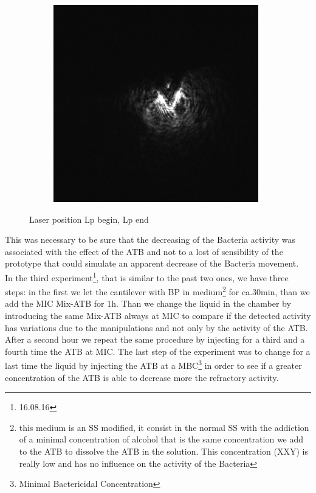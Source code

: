 \documentclass[11pt, a4paper]{article}
\begin{document}
\begin{figure}[h]
\begin{subfigure}{0.245\linewidth}
		\includegraphics[width=1\linewidth]{FFT/Lp_0208_correct} %
		\caption{}\label{fig:0208}
	\end{subfigure}
\caption{Laser position  Lp begin,  Lp end} 
\end{figure}%
This was necessary to be sure that the decreasing of the Bacteria activity was associated with the effect of the ATB and not to a lost of sensibility of the prototype that could simulate an apparent decrease of the Bacteria movement. 
\\
In the third experiment\footnote{16.08.16}, that is similar to the past two ones, we have three steps: in the first we let the cantilever with BP in medium\footnote{this medium is an SS modified, it consist in the normal SS with the addiction of a minimal concentration of alcohol that is the same concentration we add to the ATB to dissolve the ATB in the solution. This concentration (XXY) is really low and has no influence on the activity of the Bacteria} for ca.30min, than we add the MIC Mix-ATB for 1h. Than we change the liquid in the chamber by introducing the same Mix-ATB always at MIC to compare if the detected activity has variations due to the manipulations and not only by the activity of the ATB. After a second hour we repeat the same procedure by injecting for a third and a fourth time the ATB at MIC. The last step of the experiment was to change for a last time the liquid by injecting the ATB at a MBC\footnote{Minimal Bactericidal Concentration} in order to see if a greater concentration of the ATB is able to decrease more the refractory activity. 
\end{document}
